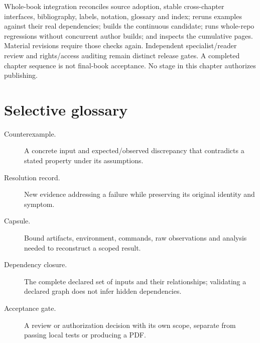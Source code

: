 
Whole-book integration reconciles source adoption, stable cross-chapter
interfaces, bibliography, labels, notation, glossary and index; reruns examples
against their real dependencies; builds the continuous candidate; runs whole-repo
regressions without concurrent author builds; and inspects the cumulative pages.
Material revisions require those checks again. Independent specialist/reader review and rights/access auditing remain
distinct release gates. A completed chapter sequence is not final-book
acceptance. No stage in this chapter authorizes publishing.

\section{Selective glossary}
\begin{description}
\item[Counterexample.] A concrete input and expected/observed discrepancy that
contradicts a stated property under its assumptions.
\item[Resolution record.] New evidence addressing a failure while preserving its
original identity and symptom.
\item[Capsule.] Bound artifacts, environment, commands, raw observations and
analysis needed to reconstruct a scoped result.
\item[Dependency closure.] The complete declared set of inputs and their
relationships; validating a declared graph does not infer hidden dependencies.
\item[Acceptance gate.] A review or authorization decision with its own scope,
separate from passing local tests or producing a PDF.
\end{description}

